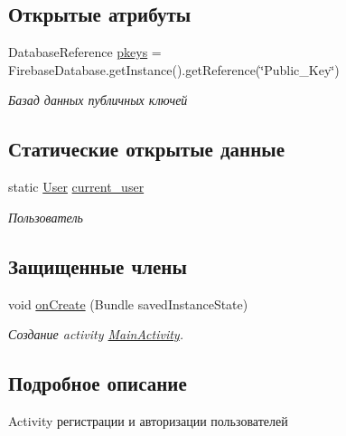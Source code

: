 \subsection*{Открытые атрибуты}
\begin{DoxyCompactItemize}
\item 
Database\+Reference \mbox{\hyperlink{classcom_1_1example_1_1firebasechat_1_1_main_activity_a058a21d2029c7bfbb3365c50b621e043}{pkeys}} = Firebase\+Database.\+get\+Instance().get\+Reference(\char`\"{}Public\+\_\+\+Key\char`\"{})
\begin{DoxyCompactList}\small\item\em Базад данных публичных ключей \end{DoxyCompactList}\end{DoxyCompactItemize}
\subsection*{Статические открытые данные}
\begin{DoxyCompactItemize}
\item 
static \mbox{\hyperlink{classcom_1_1example_1_1firebasechat_1_1_user}{User}} \mbox{\hyperlink{classcom_1_1example_1_1firebasechat_1_1_main_activity_a139972aaf697b18799afeede7a832bc0}{current\+\_\+user}}
\begin{DoxyCompactList}\small\item\em Пользователь \end{DoxyCompactList}\end{DoxyCompactItemize}
\subsection*{Защищенные члены}
\begin{DoxyCompactItemize}
\item 
void \mbox{\hyperlink{classcom_1_1example_1_1firebasechat_1_1_main_activity_a65ecbc7b4bebeeee38c9e5ae03720412}{on\+Create}} (Bundle saved\+Instance\+State)
\begin{DoxyCompactList}\small\item\em Создание activity \mbox{\hyperlink{classcom_1_1example_1_1firebasechat_1_1_main_activity}{Main\+Activity}}. \end{DoxyCompactList}\end{DoxyCompactItemize}


\subsection{Подробное описание}
Activity регистрации и авторизации пользователей 

